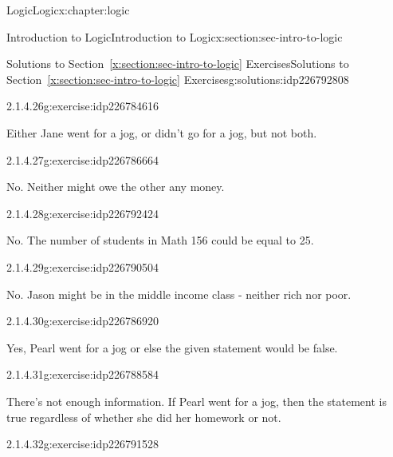 \documentclass[twoside,10pt,]{book}
\newcommand{\xreffont}{\relax}
\numberwithin{equation}{section}
\begin{document}
\begin{chapterptx}{Logic}{}{Logic}{}{}{x:chapter:logic}
\begin{sectionptx}{Introduction to Logic}{}{Introduction to Logic}{}{}{x:section:sec-intro-to-logic}
\begin{solutions-subsection}{Solutions to Section~{\xreffont\ref*{x:section:sec-intro-to-logic}} Exercises}{}{Solutions to Section~{\xreffont\ref*{x:section:sec-intro-to-logic}} Exercises}{}{}{g:solutions:idp226792808}
\begin{exercisegroup}
\begin{divisionsolutioneg}{2.1.4.26}{}{g:exercise:idp226784616}%
\par\smallskip%
\noindent\hypertarget{g:solution:idp226785000-main}{}Either Jane went for a jog, or didn't go for a jog, but not both.\end{divisionsolutioneg}%
\end{exercisegroup}
\par\medskip\noindent
\begin{exercisegroup}
\begin{divisionsolutioneg}{2.1.4.27}{}{g:exercise:idp226786664}%
\par\smallskip%
\noindent\hypertarget{g:solution:idp226791400-main}{}No.  Neither might owe the other any money.\end{divisionsolutioneg}%
\begin{divisionsolutioneg}{2.1.4.28}{}{g:exercise:idp226792424}%
\par\smallskip%
\noindent\hypertarget{g:solution:idp226787048-main}{}No.  The number of students in Math 156 could be equal to 25.\end{divisionsolutioneg}%
\begin{divisionsolutioneg}{2.1.4.29}{}{g:exercise:idp226790504}%
\par\smallskip%
\noindent\hypertarget{g:solution:idp226791784-main}{}No. Jason might be in the middle income class - neither rich nor poor.\end{divisionsolutioneg}%
\end{exercisegroup}
\par\medskip\noindent
\begin{exercisegroup}
\begin{divisionsolutioneg}{2.1.4.30}{}{g:exercise:idp226786920}%
\par\smallskip%
\noindent\hypertarget{g:solution:idp226785896-main}{}Yes, Pearl went for a jog or else the given statement would be false.\end{divisionsolutioneg}%
\begin{divisionsolutioneg}{2.1.4.31}{}{g:exercise:idp226788584}%
\par\smallskip%
\noindent\hypertarget{g:solution:idp226787816-main}{}There's not enough information.  If Pearl went for a jog, then the statement is true regardless of whether she did her homework or not.\end{divisionsolutioneg}%
\begin{divisionsolutioneg}{2.1.4.32}{}{g:exercise:idp226791528}%
\par\smallskip%

\end{divisionsolutioneg}
\end{exercisegroup}
\end{solutions-subsection}
\end{sectionptx}
\end{chapterptx}
\end{document}
